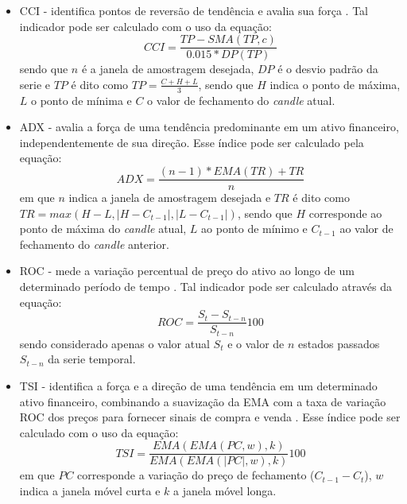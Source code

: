 \begin{itemize}
    \item \ac{CCI} - identifica pontos de reversão de tendência e avalia sua força \cite{altan2019effect, halil2019predicting}. Tal indicador pode ser calculado com o uso da equação:
    \begin{equation}
        \label{eq:CCI}
        CCI = \frac{TP - SMA(TP,c)}{0.015 * DP(TP)}
    \end{equation}
    sendo que $n$ é a janela de amostragem desejada, $DP$ é o desvio padrão da serie e $TP$ é dito como $TP = \frac{C+H+L}{3}$, sendo que $H$ indica o ponto de máxima, $L$ o ponto de mínima e $C$ o valor de fechamento do \textit{candle} atual. 
    
    \item \ac{ADX} - avalia a força de uma tendência predominante em um ativo financeiro, independentemente de sua direção\cite{gao2021stock}. Esse índice pode ser calculado pela equação: 
    \begin{equation}
        \label{eq:ADX}
        ADX = \frac{(n-1)*EMA(TR) + TR}{n}
    \end{equation}
    em que $n$ indica a janela de amostragem desejada e $TR$ é dito como $TR = max(H-L, |H-C_{t-1}|, |L-C_{t-1}|)$, sendo que $H$ corresponde ao ponto de máxima do \textit{candle} atual, $L$ ao ponto de mínimo e $C_{t-1}$ ao valor de fechamento do \textit{candle} anterior.
    
    \item \ac{ROC} - mede a variação percentual de preço do ativo ao longo de um determinado período de tempo \cite{ampomah2020evaluation, jiang2020improved}. Tal indicador pode ser calculado através da equação: 
    \begin{equation}
        \label{eq:ROC}
        ROC = \frac{S_{t}-S_{t-n}}{S_{t-n}}100
    \end{equation}
    sendo considerado apenas o valor atual $S_t$ e o valor de $n$ estados passados $S_{t-n}$ da serie temporal.
    
    \item \ac{TSI} - identifica a força e a direção de uma tendência em um determinado ativo financeiro, combinando a suavização da \ac{EMA} com a taxa de variação \ac{ROC} dos preços para fornecer sinais de compra e venda \cite{anwar2019forecasting}. Esse índice pode ser calculado com o uso da equação:     
    \begin{equation}
        \label{eq:TSI}
        TSI = \frac{EMA(EMA(PC,w), k)}{EMA(EMA(|PC|,w), k)}100
    \end{equation}
    em que $PC$ corresponde a variação do preço de fechamento ($C_{t-1} - C_t$), $w$ indica a janela móvel curta e $k$ a janela móvel longa.
    

\end{itemize}
